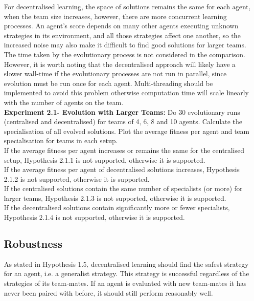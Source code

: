 \documentclass[12pt]{article}
\begin{document}
For decentralised learning, the space of solutions remains the same for each agent, when the team size increases, however, there are more concurrent learning processes. 
An agent’s score depends on many other agents executing unknown strategies in its environment, and all those strategies affect one another, so the increased noise may also make it difficult to find good solutions for larger teams.
The time taken by the evolutionary process is not considered in the comparison.
However, it is worth noting that the decentralised approach will likely have a slower wall-time if the evolutionary processes are not run in parallel, since evolution must be run once for each agent.
Multi-threading should be implemented to avoid this problem otherwise computation time will scale linearly with the number of agents on the team.\\

\textbf{Experiment 2.1- Evolution with Larger Teams:} Do 30 evolutionary runs (centralised and decentralised) for teams of 4, 6, 8 and 10 agents.
Calculate the specialisation of all evolved solutions.
Plot the average fitness per agent and team specialisation for teams in each setup. \\

If the average fitness per agent increases or remains the same for the centralised setup, Hypothesis 2.1.1 is not supported, otherwise it is supported.\\

If the average fitness per agent of decentralised solutions increases, Hypothesis 2.1.2 is not supported, otherwise it is supported.\\

If the centralised solutions contain the same number of specialists (or more) for larger teams, Hypothesis 2.1.3 is not supported, otherwise it is supported.\\

If the decentralised solutions contain significantly more or fewer specialists, Hypothesis 2.1.4 is not supported, otherwise it is supported.\\

\subsection{Robustness}

As stated in Hypothesis 1.5, decentralised learning should find the safest strategy for an agent, i.e. a generalist strategy. This strategy is successful regardless of the strategies of its team-mates. If an agent is evaluated with new team-mates it has never been paired with before, it should still perform reasonably well. \\
\end{document}
